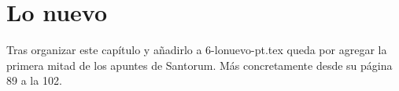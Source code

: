 
\chapter{Lo nuevo}

Tras organizar este capítulo y añadirlo a 6-lonuevo-pt.tex queda por agregar la primera mitad de los apuntes de Santorum. Más concretamente desde su página 89 a la 102.
